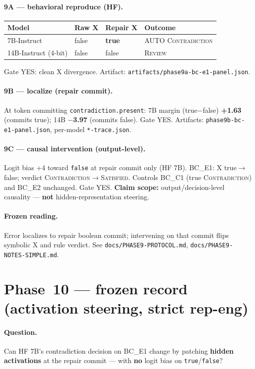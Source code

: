\documentclass[11pt,a4paper]{article}
\newcommand{\sat}{\textsc{Satisfied}}
\newcommand{\con}{\textsc{Contradiction}}
\newcommand{\rev}{\textsc{Review}}
\begin{document}
\paragraph{9A --- behavioral reproduce (HF).}
\begin{center}
\small
\begin{tabular}{llll}
\toprule
Model & Raw X & Repair X & Outcome \\
\midrule
7B-Instruct & false & \textbf{true} & AUTO \con{} \\
14B-Instruct (4-bit) & false & false & \rev{} \\
\bottomrule
\end{tabular}
\end{center}
Gate YES: clean X divergence. Artifact: \texttt{artifacts/phase9a-bc-e1-panel.json}.

\paragraph{9B --- localize (repair commit).}
At token committing \texttt{contradiction.present}: 7B margin (true$-$false) \textbf{+1.63} (commits true); 14B \textbf{$-$3.97} (commits false). Gate YES.
Artifacts: \texttt{phase9b-bc-e1-panel.json}, per-model \texttt{*-trace.json}.

\paragraph{9C --- causal intervention (output-level).}
Logit bias +4 toward \texttt{false} at repair commit only (HF 7B).
BC\_E1: X true$\rightarrow$false; verdict \con{}$\rightarrow$\sat{}.
Controls BC\_C1 (true \con{}) and BC\_E2 unchanged. Gate YES.
\textbf{Claim scope:} output/decision-level causality --- \textbf{not} hidden-representation steering.

\paragraph{Frozen reading.}
Error localizes to repair boolean commit; intervening on that commit flips symbolic X and rule verdict.
See \texttt{docs/PHASE9-PROTOCOL.md}, \texttt{docs/PHASE9-NOTES-SIMPLE.md}.

\section{Phase~10 --- frozen record (activation steering, strict rep-eng)}

\paragraph{Question.}
Can HF 7B's contradiction decision on BC\_E1 change by patching \textbf{hidden activations} at the repair commit --- with \textbf{no} logit bias on \texttt{true}/\texttt{false}?
\end{document}
